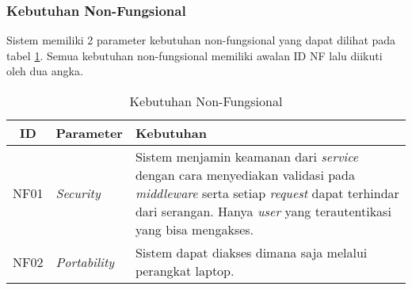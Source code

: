 \subsubsection{Kebutuhan Non-Fungsional}
Sistem memiliki 2 parameter kebutuhan non-fungsional yang dapat dilihat pada tabel \ref{tab:kebutuhan-non-fungsional}. Semua kebutuhan non-fungsional memiliki awalan ID NF lalu diikuti oleh dua angka.

\bgroup
\begin{table}[ht]
  \def\arraystretch{1.7}
  \caption{Kebutuhan Non-Fungsional}
  \label{tab:kebutuhan-non-fungsional}
  \centering
  \begin{tabular}{|c|p{3cm}|p{8cm}|}
    \hline
    ID   & Parameter            & Kebutuhan                                                                                                                                                                                                                          \\
    \hline
    NF01 & \textit{Security}    & Sistem menjamin keamanan dari \textit{service} dengan cara menyediakan validasi pada \textit{middleware} serta setiap \textit{request} dapat terhindar dari serangan. Hanya \textit{user} yang terautentikasi yang bisa mengakses. \\
    \hline
    NF02 & \textit{Portability} & Sistem dapat diakses dimana saja melalui perangkat laptop.                                                                                                                                                                         \\
    \hline
  \end{tabular}
\end{table}
\egroup